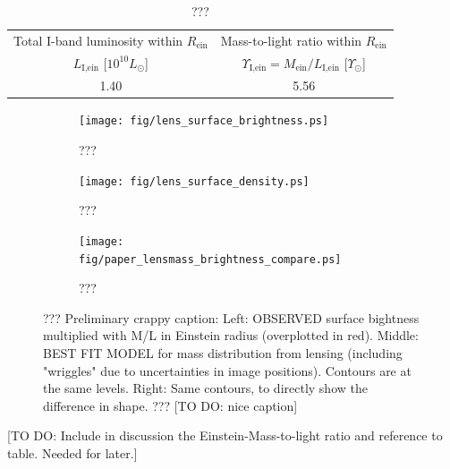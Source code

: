 
\begin{table}
\centering
\caption{???}
\begin{tabular}{cc}
\hline
Total I-band luminosity within $R_\text{ein}$ & Mass-to-light ratio within $R_\text{ein}$\\
 $L_\text{I,ein}$ [$10^{10} L_\odot$] & $\Upsilon_\text{I,ein} = M_\text{ein} / L_\text{I,ein}$ [$\Upsilon_\odot$]\\\hline
1.40 & 5.56\\\hline
\end{tabular}  
\label{tab:einsteinML} 
\end{table}


\begin{figure}
\centering
\begin{subfigure}{.3\textwidth}
  \centering
  \texttt{[image: fig/lens\_surface\_brightness.ps]}
  \caption{???}
  \label{fig:lenscomparelight}
\end{subfigure}%
\begin{subfigure}{.3\textwidth}
  \centering
  \texttt{[image: fig/lens\_surface\_density.ps]}
  \caption{???}
  \label{fig:lenscomparemass}
\end{subfigure}
\begin{subfigure}{.3\textwidth}
  \centering
  \texttt{[image: fig/paper\_lensmass\_brightness\_compare.ps]}
  \caption{???}
  \label{fig:lenscompareboth}
\end{subfigure}
\caption{??? Preliminary crappy caption: Left: OBSERVED surface bightness multiplied with M/L in Einstein radius (overplotted in red). Middle: BEST FIT MODEL for mass distribution from lensing (including "wriggles" due to uncertainties in image positions). Contours are at the same levels. Right: Same contours, to directly show the difference in shape. ??? [TO DO: nice caption]}
\label{fig:lenslightcompareALL}
\end{figure}

[TO DO: Include in discussion the Einstein-Mass-to-light ratio and reference to table. Needed for later.]